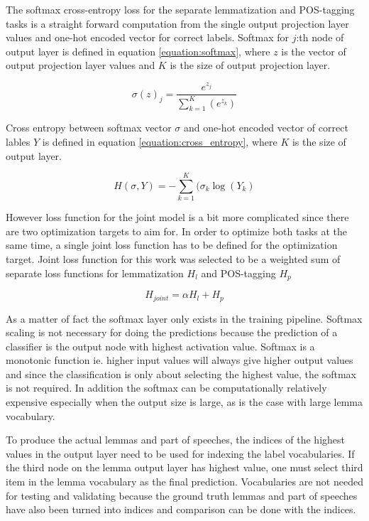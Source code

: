 \documentclass[12pt,a4paper,english
]{tutthesis}
\begin{document}
The softmax cross-entropy loss for the separate lemmatization and POS-tagging tasks is a straight forward computation from the single output projection layer values and one-hot encoded vector for correct labels. Softmax for $j$:th node of output layer is defined in equation \ref{equation:softmax}, where $z$ is the vector of output projection layer values and $K$ is the size of output projection layer.

\begin{equation}
\label{equation:softmax}
\sigma(z)_j=\frac{e^{z_j}}{\sum_{k=1}^{K}(e^{z_k})}
\end{equation}

Cross entropy between softmax vector $\sigma$ and one-hot encoded vector of correct lables $Y$ is defined in equation \ref{equation:cross_entropy}, where $K$ is the size of output layer.

\begin{equation}
\label{equation:cross_entropy}
H(\sigma, Y) = -\sum_{k=1}^{K}(\sigma_k \log(Y_k)
\end{equation}

However loss function for the joint model is a bit more complicated since there are two optimization targets to aim for. In order to optimize both tasks at the same time, a single joint loss function has to be defined for the optimization target. Joint loss function for this work was selected to be a weighted sum of separate loss functions for lemmatization $H_l$ and POS-tagging $H_p$

\begin{equation}
\label{equation:joint_loss}
H_{joint}=\alpha H_l + H_p
\end{equation}

As a matter of fact the softmax layer only exists in the training pipeline. Softmax scaling is not necessary for doing the predictions because the prediction of a classifier is the output node with highest activation value. Softmax is a monotonic function ie. higher input values will always give higher output values and since the classification is only about selecting the highest value, the softmax is not required. In addition the softmax can be computationally relatively expensive especially when the output size is large, as is the case with large lemma vocabulary.

To produce the actual lemmas and part of speeches, the indices of the highest values in the output layer need to be used for indexing the label vocabularies. If the third node on the lemma output layer has highest value, one must select third item in the lemma vocabulary as the final prediction. Vocabularies are not needed for testing and validating because the ground truth lemmas and part of speeches have also been turned into indices and comparison can be done with the indices.
\end{document}
